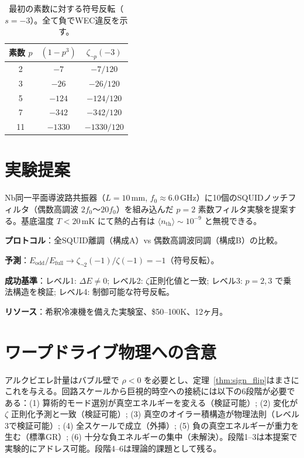 \documentclass[11pt,a4paper]{article}
\begin{document}
\begin{table}[h]
\centering
\caption{最初の素数に対する符号反転（$s=-3$）。全て負でWEC違反を示す。}
\begin{tabular}{@{}ccc@{}}
\toprule
素数 $p$ & $(1-p^3)$ & $\zeta_{\neg p}(-3)$ \\
\midrule
2 & $-7$ & $-7/120$ \\
3 & $-26$ & $-26/120$ \\
5 & $-124$ & $-124/120$ \\
7 & $-342$ & $-342/120$ \\
11 & $-1330$ & $-1330/120$ \\
\bottomrule
\end{tabular}
\end{table}

\section{実験提案}

Nb同一平面導波路共振器（$L=10\,$mm, $f_0 \approx 6.0\,$GHz）に10個のSQUIDノッチフィルタ（偶数高調波 $2f_0$〜$20f_0$）を組み込んだ $p=2$ 素数フィルタ実験を提案する。基底温度 $T < 20\,$mK にて熱的占有は $\langle n_{\mathrm{th}}\rangle \sim 10^{-9}$ と無視できる。

\textbf{プロトコル}：全SQUID離調（構成A）vs 偶数高調波同調（構成B）の比較。

\textbf{予測}：$E_{\mathrm{odd}}/E_{\mathrm{full}} \to \zeta_{\neg 2}(-1)/\zeta(-1) = -1$（符号反転）。

\textbf{成功基準}：レベル1: $\Delta E \neq 0$; レベル2: $\zeta$正則化値と一致; レベル3: $p=2,3$ で乗法構造を検証; レベル4: 制御可能な符号反転。

\textbf{リソース}：希釈冷凍機を備えた実験室、\$50--100K、12ヶ月。

\section{ワープドライブ物理への含意}

アルクビエレ計量はバブル壁で $\rho < 0$ を必要とし、定理~\ref{thm:sign_flip}はまさにこれを与える。回路スケールから巨視的時空への接続には以下の6段階が必要である：(1) 算術的モード選別が真空エネルギーを変える（検証可能）; (2) 変化が $\zeta$ 正則化予測と一致（検証可能）; (3) 真空のオイラー積構造が物理法則（レベル3で検証可能）; (4) 全スケールで成立（外挿）; (5) 負の真空エネルギーが重力を生む（標準GR）; (6) 十分な負エネルギーの集中（未解決）。段階1--3は本提案で実験的にアドレス可能。段階4--6は理論的課題として残る。
\end{document}
